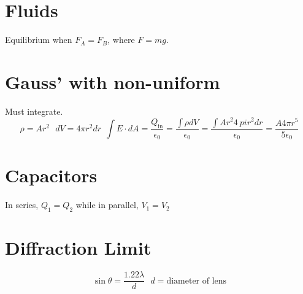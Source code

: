 \documentclass[10pt,a4paper]{article}
\begin{document}
\section{Fluids} %
\label{sec:fluids}
Equilibrium when $F_A = F_B$, where $F=mg$. 

\section{Gauss' with non-uniform} %
\label{sec:gauss_with_non_uniform}
Must integrate. 
\begin{equation}
    \rho = Ar^2 ~~~ dV = 4\pi r^2dr ~~ \int E \cdot dA = \frac{Q_{\textrm{in}}}{\epsilon_0} = \frac{\int \rho dV}{\epsilon_0} = \frac{\int Ar^2 4\ pi r^2 dr}{\epsilon_0} = \frac{A 4\pi r^5}{5 \epsilon_0}
\end{equation}

\section{Capacitors} %
\label{sec:capacitors}
In series, $Q_1 = Q_2$ while in parallel, $V_1 = V_2$

\section{Diffraction Limit} %
\label{sec:diffraction_limit}
\begin{equation}
    \sin \theta = \frac{1.22 \lambda}{d}~~~d=\textrm{diameter of lens}
\end{equation}
\end{document}

